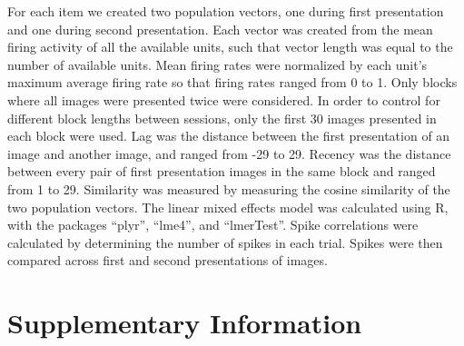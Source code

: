 \documentclass{apa}
\begin{document}
For each item we created two population vectors, one during first
presentation and one during second presentation. Each vector was created from
the mean firing activity of all the available units, such that vector length
was equal to the number of available units. Mean firing rates were normalized
by each unit's maximum average firing rate so that firing rates ranged from 0
to 1. Only blocks where all images were presented twice were considered. In
order to control for different block lengths between sessions, only the first
30 images presented in each block were used. Lag was the distance between the
first presentation of an image and another image, and ranged from -29 to 29.
Recency was the distance between every pair of first presentation images in
the same block and ranged from 1 to 29. Similarity was measured by measuring
the cosine similarity of the two population vectors. The linear mixed effects
model was calculated using R, with the packages ``plyr'', ``lme4'', and
``lmerTest''. Spike correlations were calculated by determining the number of
spikes in each trial. Spikes were then compared across first and second
presentations of images.

\nocite{Wick11,KuznEtal17,BateEtal14}


\clearpage

\setcounter{figure}{0}
\renewcommand{\thefigure}{S\arabic{figure}}

\setcounter{equation}{0}
\renewcommand{\theequation}{S\arabic{equation}}


\section{Supplementary Information}
\end{document}
